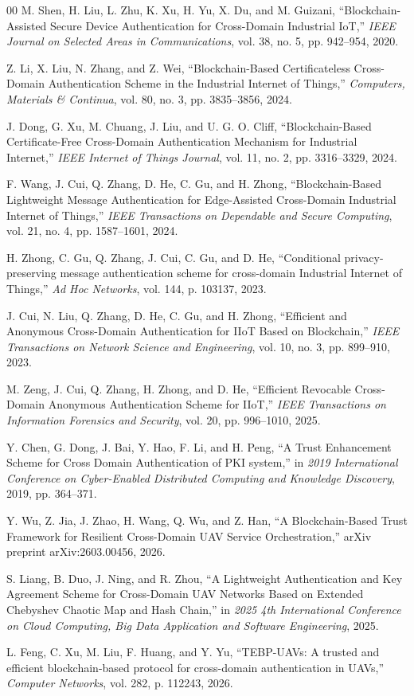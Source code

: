 \documentclass[lettersize,journal]{IEEEtran}
\begin{document}
\begin{thebibliography}{00}
		 M. Shen, H. Liu, L. Zhu, K. Xu, H. Yu, X. Du, and M. Guizani, ``Blockchain-Assisted Secure Device Authentication for Cross-Domain Industrial IoT,'' \emph{IEEE Journal on Selected Areas in Communications}, vol. 38, no. 5, pp. 942--954, 2020.
		
		 Z. Li, X. Liu, N. Zhang, and Z. Wei, ``Blockchain-Based Certificateless Cross-Domain Authentication Scheme in the Industrial Internet of Things,'' \emph{Computers, Materials \& Continua}, vol. 80, no. 3, pp. 3835--3856, 2024.
		
		 J. Dong, G. Xu, M. Chuang, J. Liu, and U. G. O. Cliff, ``Blockchain-Based Certificate-Free Cross-Domain Authentication Mechanism for Industrial Internet,'' \emph{IEEE Internet of Things Journal}, vol. 11, no. 2, pp. 3316--3329, 2024.
		
		 F. Wang, J. Cui, Q. Zhang, D. He, C. Gu, and H. Zhong, ``Blockchain-Based Lightweight Message Authentication for Edge-Assisted Cross-Domain Industrial Internet of Things,'' \emph{IEEE Transactions on Dependable and Secure Computing}, vol. 21, no. 4, pp. 1587--1601, 2024.
		
		 H. Zhong, C. Gu, Q. Zhang, J. Cui, C. Gu, and D. He, ``Conditional privacy-preserving message authentication scheme for cross-domain Industrial Internet of Things,'' \emph{Ad Hoc Networks}, vol. 144, p. 103137, 2023.
		
		 J. Cui, N. Liu, Q. Zhang, D. He, C. Gu, and H. Zhong, ``Efficient and Anonymous Cross-Domain Authentication for IIoT Based on Blockchain,'' \emph{IEEE Transactions on Network Science and Engineering}, vol. 10, no. 3, pp. 899--910, 2023.
		
		 M. Zeng, J. Cui, Q. Zhang, H. Zhong, and D. He, ``Efficient Revocable Cross-Domain Anonymous Authentication Scheme for IIoT,'' \emph{IEEE Transactions on Information Forensics and Security}, vol. 20, pp. 996--1010, 2025.
		
		 Y. Chen, G. Dong, J. Bai, Y. Hao, F. Li, and H. Peng, ``A Trust Enhancement Scheme for Cross Domain Authentication of PKI system,'' in \emph{2019 International Conference on Cyber-Enabled Distributed Computing and Knowledge Discovery}, 2019, pp. 364--371.
		
		 Y. Wu, Z. Jia, J. Zhao, H. Wang, Q. Wu, and Z. Han, ``A Blockchain-Based Trust Framework for Resilient Cross-Domain UAV Service Orchestration,'' arXiv preprint arXiv:2603.00456, 2026.
		
		 S. Liang, B. Duo, J. Ning, and R. Zhou, ``A Lightweight Authentication and Key Agreement Scheme for Cross-Domain UAV Networks Based on Extended Chebyshev Chaotic Map and Hash Chain,'' in \emph{2025 4th International Conference on Cloud Computing, Big Data Application and Software Engineering}, 2025.
		
		 L. Feng, C. Xu, M. Liu, F. Huang, and Y. Yu, ``TEBP-UAVs: A trusted and efficient blockchain-based protocol for cross-domain authentication in UAVs,'' \emph{Computer Networks}, vol. 282, p. 112243, 2026.
		
	\end{thebibliography}
	
\end{document}
